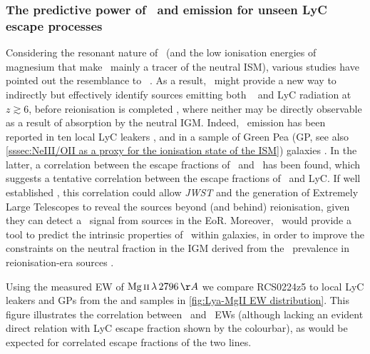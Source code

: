 \subsubsection{The predictive power of \texorpdfstring{\lya\ and \MgII}{\lyatext and MgII} emission for unseen LyC escape processes}
\label{sssec:Lya and MgII tracing LyC escape}

Considering the resonant nature of \MgII\ (and the low ionisation energies of magnesium that make \MgII\ mainly a tracer of the neutral ISM), various studies have pointed out the resemblance to \lya\ \citep[e.g.][]{2018ApJ...855...96H, 2018A&A...617A..62F}. As a result, \MgII\ might provide a new way to indirectly but effectively identify sources emitting both \lya\ \citep[commonly used as a probe for measuring the conditions of the IGM, see][]{2014PASA...31...40D} and LyC radiation at $z \gtrsim 6$, before reionisation is completed \citep{2015MNRAS.447..499M}, where neither may be directly observable as a result of absorption by the neutral IGM. Indeed, \MgII\ emission has been reported in ten local LyC leakers \citep{2016MNRAS.461.3683I, 2016Natur.529..178I, 2018MNRAS.474.4514I, 2018MNRAS.478.4851I, 2020MNRAS.497.4293G}, and in a sample of Green Pea (GP, see also \cref{sssec:NeIII/OII as a proxy for the ionisation state of the ISM}) galaxies \citep{2018ApJ...855...96H}. In the latter, a correlation between the escape fractions of \MgII\ and \lya\ has been found, which suggests a tentative correlation between the escape fractions of \MgII\ and LyC. If well established \citep[promising first results have been reported,][]{2020MNRAS.498.2554C, 2021MNRAS.505.1382M}, this correlation could allow \textit{JWST} and the generation of Extremely Large Telescopes to reveal the sources beyond (and behind) reionisation, given they can detect a \MgII\ signal from sources in the EoR. Moreover, \MgII\ would provide a tool to predict the intrinsic properties of \lya\ within galaxies, in order to improve the constraints on the neutral fraction in the IGM derived from the \lya\ prevalence in reionisation-era sources \citep[e.g.][]{2014ApJ...795...20S, 2018ApJ...856....2M, 2018A&A...619A.147P}.

Using the measured EW of $\MgII \, \lambda \, 2796 \, \Angstrom$ we compare RCS0224z5 to local LyC leakers and GPs from the \citeauthor{2016Natur.529..178I} and \citeauthor{2018ApJ...855...96H} samples in \cref{fig:Lya-MgII EW distribution}. This figure illustrates the correlation between \lya\ and \MgII\ EWs (although lacking an evident direct relation with LyC escape fraction shown by the colourbar), as would be expected for correlated escape fractions of the two lines.

